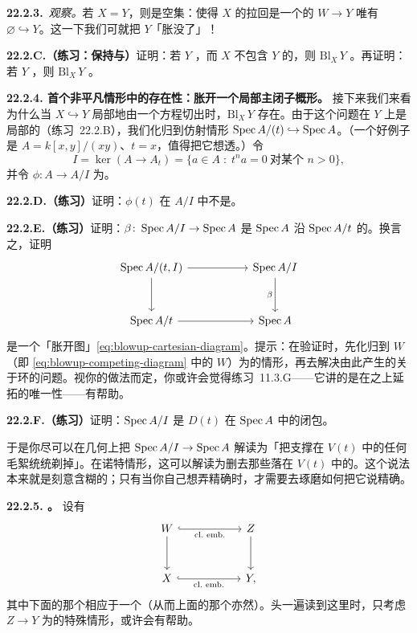\textbf{22.2.3.}\ \emph{观察。}\quad 若 $X=Y$，则\trBlowup{}是空集：使得 $X$ 的拉回是一个\trEffectiveCartierDivisor{}的\trMorphism{} $W\to Y$ 唯有 $\varnothing\hookrightarrow Y$。这一下我们可就把 $Y$「胀没了」！

\textbf{22.2.C.（练习：\trBlowup{}保持\trIrreducibility{}与\trReducedness）}\quad 证明：若 $Y$ \trIrreducible，而 $X$ 不包含 $Y$ 的\trGenericPoint，则 $\mathrm{Bl}_X\,Y$ \trIrreducible。再证明：若 $Y$ \trReduced，则 $\mathrm{Bl}_X\,Y$ \trReduced。

\textbf{22.2.4. 首个非平凡情形中的存在性：胀开一个局部主闭子概形。}\quad
接下来我们来看为什么当 $X\hookrightarrow Y$ 局部地由一个方程切出时，$\mathrm{Bl}_X\,Y$ 存在。由于这个问题在 $Y$ 上是局部的（\mbox{练习~22.2.B}），我们化归到仿射情形 $\operatorname{Spec} A/(t)\hookrightarrow\operatorname{Spec} A$。（一个好例子是 $A=k[x,y]/(xy)$、$t=x$，值得把它想透。）令
\[
I=\ker(A\to A_t)=\{a\in A\;:\;t^na=0\ \text{对某个 } n>0\},
\]
并令 $\phi\colon A\to A/I$ 为\trProjection。

\textbf{22.2.D.（练习）}\quad 证明：$\phi(t)$ 在 $A/I$ 中不是\trZerodivisor。

\textbf{22.2.E.（练习）}\quad 证明：$\beta\colon\operatorname{Spec} A/I\to\operatorname{Spec} A$ 是 $\operatorname{Spec} A$ 沿 $\operatorname{Spec} A/t$ 的\trBlowup。换言之，证明
\[
\begin{tikzcd}[row sep=3em, column sep=5.4em]
\Spec A/(t,I) \ar[r] \ar[d] & \Spec A/I \ar[d,"\beta"'] \\
\Spec A/t \ar[r] & \Spec A
\end{tikzcd}
\]
是一个「胀开图」\eqref{eq:blowup-cartesian-diagram}。提示：在验证\trUniversalProperty{}时，先化归到 $W$（即 \eqref{eq:blowup-competing-diagram} 中的 $W$）为\trAffine{}的情形，再去解决由此产生的关于环的问题。视你的做法而定，你或许会觉得\mbox{练习~11.3.G}——它讲的是在\trEffectiveCartierDivisor{}之上\trMorphism{}延拓的唯一性——有帮助。

\textbf{22.2.F.（练习）}\quad 证明：$\operatorname{Spec} A/I$ 是 $D(t)$ 在 $\operatorname{Spec} A$ 中的\trSchemeTheoretic{}闭包。

于是你尽可以在几何上把 $\operatorname{Spec} A/I\to\operatorname{Spec} A$ 解读为「把支撑在 $V(t)$ 中的任何毛絮统统剃掉」。在诺特情形，这可以解读为删去那些落在 $V(t)$ 中的\trAssociatedPoint。这个说法本来就是刻意含糊的；只有当你自己想弄精确时，才需要去琢磨如何把它说精确。

\textbf{22.2.5. \trBlowupClosureLemma。}\quad
设有\trCartesianDiagram
\[
\begin{tikzcd}[row sep=3em, column sep=5.6em]
W \ar[r,hook,"\text{cl.~emb.}"'] \ar[d] & Z \ar[d] \\
X \ar[r,hook,"\text{cl.~emb.}"'] & Y,
\end{tikzcd}
\]
其中下面的那个\trClosedEmbedding{}相应于一个\trFiniteType\trIdealSheaf（从而上面的那个亦然）。头一遍读到这里时，只考虑 $Z\to Y$ 为\trClosedEmbedding{}的特殊情形，或许会有帮助。

